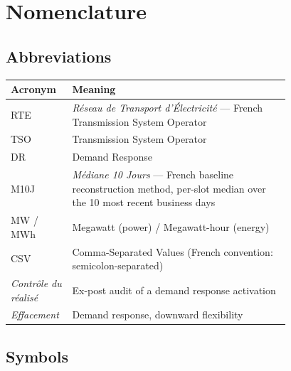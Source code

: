 \documentclass{article}
\begin{document}
\onecolumn
\appendix

\section{Nomenclature}
\label{app:nomenclature}

\subsection*{Abbreviations}

\begin{tabular}{@{}lp{0.78\linewidth}@{}}
\toprule
Acronym & Meaning \\ \midrule
RTE   & \textit{R\'eseau de Transport d'\'Electricit\'e} --- French Transmission System Operator \\
TSO   & Transmission System Operator \\
DR    & Demand Response \\
M10J  & \textit{M\'ediane 10 Jours} --- French baseline reconstruction method, per-slot median over the 10 most recent business days \\
MW / MWh & Megawatt (power) / Megawatt-hour (energy) \\
CSV   & Comma-Separated Values (French convention: semicolon-separated) \\
\textit{Contr\^ole du r\'ealis\'e} & Ex-post audit of a demand response activation \\
\textit{Effacement} & Demand response, downward flexibility \\ \bottomrule
\end{tabular}

\vspace{0.5cm}

\subsection*{Symbols}
\end{document}
